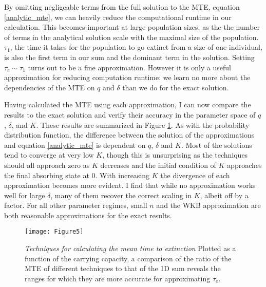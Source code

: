 \ifffalse %
By omitting negligeable terms from the full solution to the MTE, equation \ref{analytic_mte}, we can heavily reduce the computational runtime in our calculation.
This becomes important at large population sizes, as the the number of terms in the analytical solution scale with the maximal size of the population.
$\tau_1$, the time it takes for the population to go extinct from a size of one individual, is also the first term in our sum and the dominant term in the solution.
Setting $\tau_e \sim \tau_1$ turns out to be a fine approximation.
However it is only a useful approximation for reducing computation runtime: we learn no more about the dependencies of the MTE on $q$ and $\delta$ than we do for the exact solution. 
\fi

Having calculated the MTE using each approximation, I can now compare the results to the exact solution and verify their accuracy in the parameter space of $q$, $\delta$, and $K$.
These results are summarized in Figure \ref{mte_techn}.
As with the probability distribution function, the difference between the solution of the approximations and equation \ref{analytic_mte} is dependent on $q$, $\delta$ and $K$. 
Most of the solutions tend to converge at very low $K$, though this is unsurprising as the techniques should all approach zero as $K$ decreases and the initial condition of $K$ approaches the final absorbing state at $0$. 
With increasing $K$ the divergence of each approximation becomes more evident. 
I find that while no approximation works well for large $\delta$, many of them recover the correct scaling in $K$, albeit off by a factor. %
For all other parameter regimes, small $n$ and the WKB approximation are both reasonable approximations for the exact results. %

\begin{figure}[ht!]
	\centering
	\texttt{[image: Figure5]}
	\caption{\emph{Techniques for calculating the mean time to extinction} Plotted as a function of the carrying capacity, a comparison of the ratio of the MTE of different techniques to that of the 1D sum reveals the ranges for which they are more accurate for approximating $\tau_{e}$.} \label{mte_techn}
\end{figure}






